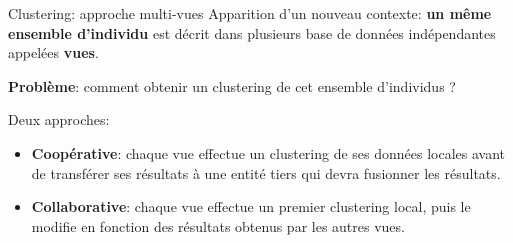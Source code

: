 \documentclass[hyperref={pdfpagelabels=false}]{beamer}
\begin{document}
    \begin{frame}{Clustering: approche multi-vues}
        Apparition d'un nouveau contexte: \textbf{un même ensemble d'individu} 
        est décrit dans plusieurs base de données indépendantes appelées 
        \textbf{vues}.

        \textbf{Problème}: comment obtenir un clustering de cet ensemble 
        d'individus ?

        Deux approches:
        \begin{itemize}
            \item<2-> {\textbf{Coopérative}: chaque 
                vue effectue un clustering de ses données locales avant de 
            transférer ses résultats à une entité tiers qui devra fusionner les 
        résultats.}
            \item<3-> \textbf{Collaborative}: chaque vue effectue un premier 
                clustering local, puis le modifie en fonction des résultats 
                obtenus par les autres vues.
        \end{itemize}
    \end{frame}

\end{document}

